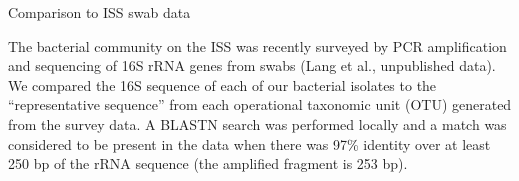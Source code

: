 Comparison to ISS swab data

The bacterial community on the ISS was recently surveyed by PCR amplification and sequencing of 16S rRNA genes from swabs (Lang et al., unpublished data). We compared the 16S sequence of each of our bacterial isolates to the “representative sequence” from each operational taxonomic unit (OTU) generated from the survey data. A BLASTN search was performed locally and a match was considered to be present in the data when there was 97\% identity over at least 250 bp of the rRNA sequence (the amplified fragment is 253 bp).
